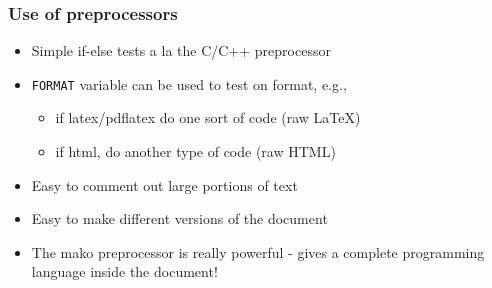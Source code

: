 \documentclass{beamer}
\begin{document}
\begin{frame}
\frametitle{Use of preprocessors}

\begin{itemize}
 \item Simple if-else tests a la the C/C++ preprocessor

 \item \Verb!FORMAT! variable can be used to test on format, e.g.,
\begin{itemize}

    \item if latex/pdflatex do one sort of code (raw {\LaTeX})

    \item if html, do another type of code (raw HTML)

\end{itemize}

\noindent
 \item Easy to comment out large portions of text

 \item Easy to make different versions of the document

 \item The mako preprocessor is really powerful - gives a
   complete programming language inside the document!
\end{itemize}

\noindent
\end{frame}
\end{document}
